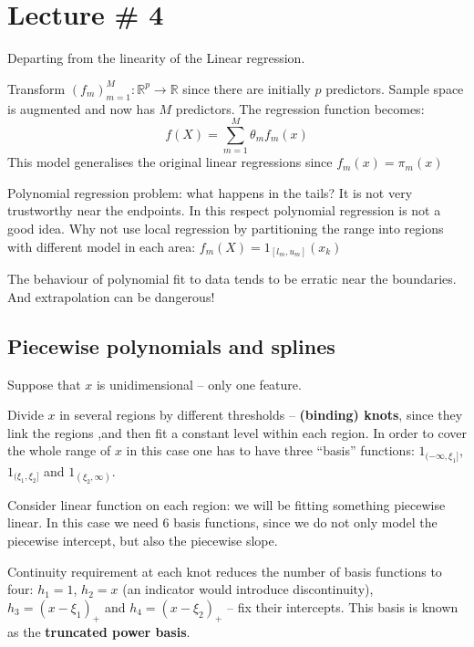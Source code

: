 \documentclass[a4paper]{article}
\newcommand{\clo}[1]{{\left [ #1 \right ]}}
\newcommand{\brac}[1]{{\left ( #1 \right )}}
\newcommand{\Real}{\mathbb{R}}
\begin{document}


\clearpage
\section{Lecture \# 4} %
\label{sec:lecture_4}
Departing from the linearity of the Linear regression.

Transform $\brac{f_m}_{m=1}^M:\Real^p \to \Real$ since there are initially $p$
predictors. Sample space is augmented and now has $M$ predictors. The regression
function becomes:
\[f(X) = \sum_{m=1}^M \theta_m f_m(x)\]
This model generalises the original linear regressions since $f_m(x) = \pi_m(x)$ 

Polynomial regression problem: what happens in the tails? It is not very trustworthy
near the endpoints. In this respect polynomial regression is not a good idea. Why
not use local regression by partitioning the range into regions with different model
in each area: $f_m(X) = 1_{\clo{l_m, u_m}}(x_k)$

The behaviour of polynomial fit to data tends to be erratic near the boundaries.
And extrapolation can be dangerous!

\subsection{Piecewise polynomials and splines} %
\label{sub:piecewise_polynomials_and_splines}

Suppose that $x$ is unidimensional -- only one feature.

Divide $x$ in several regions by different thresholds -- \textbf{(binding) knots},
since they link the regions ,and then fit a constant level within each region.
In order to cover the whole range of $x$ in this case one has to have three
``basis'' functions:
$1_{(-\infty, \xi_1]}$, $1_{(\xi_1, \xi_2]}$ and $1_{(\xi_2, \infty)}$.

Consider linear function on each region: we will be fitting something piecewise
linear. In this case we need $6$ basis functions, since we do not only model the
piecewise intercept, but also the piecewise slope.

Continuity requirement at each knot reduces the number of basis functions to four:
$h_1 = 1$, $h_2 = x$ (an indicator would introduce discontinuity),
$h_3 = (x-\xi_1)_+$ and $h_4 = (x-\xi_2)_+$ -- fix their intercepts.
This basis is known as the \textbf{truncated power basis}.
\end{document}
